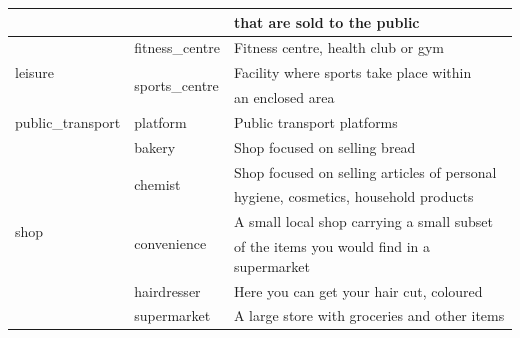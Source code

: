 \begin{table}[H]
\begin{tabular}{l l l}
& & that are sold to the public \\
\midrule
\multirow{3}{*}{leisure} & fitness\_centre & Fitness centre, health club or gym \\
& \multirow{2}{*}{sports\_centre} & Facility where sports take place within \\
& & an enclosed area \\
\midrule
public\_transport & platform & Public transport platforms \\
\midrule
\multirow{7}{*}{shop} & bakery & Shop focused on selling bread	\\
& \multirow{2}{*}{chemist} & Shop focused on selling articles of personal \\
& & hygiene, cosmetics, household products \\
& \multirow{2}{*}{convenience} & A small local shop carrying a small subset \\
& & of the items you would find in a supermarket	\\
& hairdresser & Here you can get your hair cut, coloured \\
& supermarket & A large store with groceries and other items \\
\bottomrule
\end{tabular}
\end{table}
